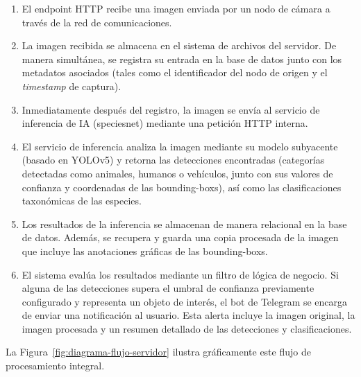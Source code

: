 \documentclass[a4paper, 12pt]{report}
\begin{document}
\begin{enumerate}
  \item El \gls{endpoint} HTTP recibe una imagen enviada por un nodo de cámara a través de la red de comunicaciones.
  \item La imagen recibida se almacena en el sistema de archivos del servidor. De manera simultánea, se registra su entrada en la base de datos junto con los metadatos asociados (tales como el identificador del nodo de origen y el \textit{timestamp} de captura).
  \item Inmediatamente después del registro, la imagen se envía al servicio de inferencia de IA (\gls{speciesnet}) mediante una petición HTTP interna.
  \item El servicio de inferencia analiza la imagen mediante su modelo subyacente (basado en YOLOv5) y retorna las detecciones encontradas (categorías detectadas como animales, humanos o vehículos, junto con sus valores de confianza y coordenadas de las \glspl{bounding-box}), así como las clasificaciones taxonómicas de las especies.
  \item Los resultados de la inferencia se almacenan de manera relacional en la base de datos. Además, se recupera y guarda una copia procesada de la imagen que incluye las anotaciones gráficas de las \glspl{bounding-box}.
  \item El sistema evalúa los resultados mediante un filtro de lógica de negocio. Si alguna de las detecciones supera el umbral de confianza previamente configurado y representa un objeto de interés, el bot de Telegram se encarga de enviar una notificación al usuario. Esta alerta incluye la imagen original, la imagen procesada y un resumen detallado de las detecciones y clasificaciones.
\end{enumerate}

La Figura~\ref{fig:diagrama-flujo-servidor} ilustra gráficamente este flujo de procesamiento integral.
\end{document}
